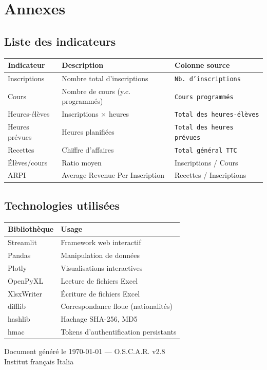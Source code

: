 \documentclass[12pt,a4paper,twoside]{article}
\begin{document}
\section{Annexes}

\subsection{Liste des indicateurs}

\begin{center}
\begin{tabularx}{\textwidth}{lXl}
\toprule
\textbf{Indicateur} & \textbf{Description} & \textbf{Colonne source} \\
\midrule
Inscriptions & Nombre total d'inscriptions & \texttt{Nb. d'inscriptions} \\
Cours & Nombre de cours (y.c. programm\'{e}s) & \texttt{Cours programm\'{e}s} \\
Heures-\'{e}l\`{e}ves & Inscriptions $\times$ heures & \texttt{Total des heures-\'{e}l\`{e}ves} \\
Heures pr\'{e}vues & Heures planifi\'{e}es & \texttt{Total des heures pr\'{e}vues} \\
Recettes & Chiffre d'affaires & \texttt{Total g\'{e}n\'{e}ral TTC} \\
\'{E}l\`{e}ves/cours & Ratio moyen & Inscriptions / Cours \\
ARPI & Average Revenue Per Inscription & Recettes / Inscriptions \\
\bottomrule
\end{tabularx}
\end{center}

\subsection{Technologies utilis\'{e}es}

\begin{center}
\begin{tabular}{ll}
\toprule
\textbf{Biblioth\`{e}que} & \textbf{Usage} \\
\midrule
Streamlit & Framework web interactif \\
Pandas & Manipulation de donn\'{e}es \\
Plotly & Visualisations interactives \\
OpenPyXL & Lecture de fichiers Excel \\
XlsxWriter & \'{E}criture de fichiers Excel \\
difflib & Correspondance floue (nationalit\'{e}s) \\
hashlib & Hachage SHA-256, MD5 \\
hmac & Tokens d'authentification persistants \\
\bottomrule
\end{tabular}
\end{center}

\vfill
\begin{center}
\color{ifiGray}\small
Document g\'{e}n\'{e}r\'{e} le \today{} --- O.S.C.A.R. v2.8\\
Institut fran\c{c}ais Italia
\end{center}
\end{document}
